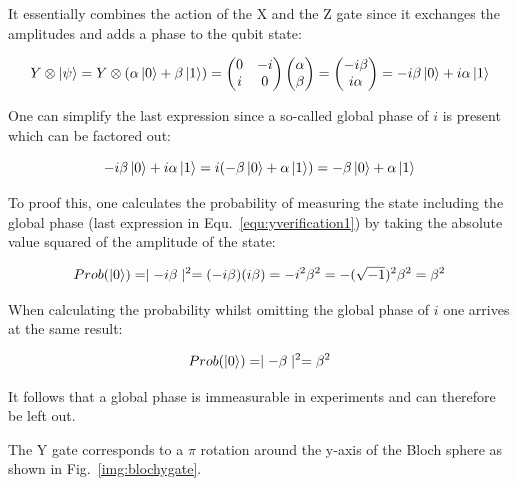 It essentially combines the action of the X and the Z gate since it exchanges the amplitudes and adds a phase to the qubit state:

\begin{equation}
\label{equ:yverification1}
Y \otimes \ket{\psi} = Y \otimes (\alpha \ket{0} + \beta \ket{1}) = \begin{pmatrix}
 0 & -i \\ 
 i & 0
 \end{pmatrix} \begin{pmatrix}
 \alpha  \\ 
 \beta
 \end{pmatrix} = \begin{pmatrix}
 -i\beta  \\ 
 i\alpha
 \end{pmatrix} = -i\beta \ket{0} + i\alpha \ket{1}
\end{equation}

One can simplify the last expression since a so-called global phase of $i$ is present which can be factored out:

\begin{equation}
\label{equ:yverification2}
-i\beta \ket{0} + i\alpha \ket{1} = i(-\beta \ket{0} + \alpha \ket{1}) = -\beta \ket{0} + \alpha \ket{1}
\end{equation}

To proof this, one calculates the probability of measuring the \0 state including the global phase (last expression in Equ.~\ref{equ:yverification1}) by taking the absolute value squared of the amplitude of the \0 state:

\begin{equation}
\label{equ:globalphase}
Prob(\ket{0}) = \mid-i\beta\mid^2 = (-i\beta)(i\beta) = -i^2\beta^2 = -(\sqrt{-1})^2\beta^2 = \beta^2
\end{equation}

When calculating the probability whilst omitting the global phase of $i$ one arrives at the same result: 

\begin{equation}
\label{equ:globalphase}
Prob(\ket{0}) = \mid-\beta\mid^2 = \beta^2
\end{equation}

It follows that a global phase is immeasurable in experiments and can therefore be left out.

The Y gate corresponds to a $\pi$ rotation around the y-axis of the Bloch sphere as shown in Fig.~\ref{img:blochygate}.

